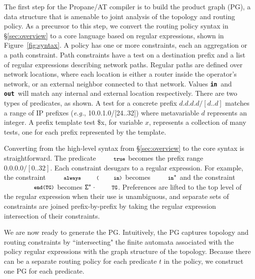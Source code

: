 \documentclass[numbers, 10pt, preprint]{sigplanconf}
\newcommand{\EG}{\emph{e.g.}}
\newcommand{\sysname}{{\text{}\small \sf Propane/AT}\xspace}
\newcommand{\CD}[1]{\texttt{\small #1}}
\newcommand{\KW}[1]{\texttt{\small\bfseries{#1}}}
\newcommand{\True}{\CD{true}}
\newcommand{\Prefer}{\texttt{>>}}
\newcommand{\Path}{\texttt{=>}}
\newcommand{\In}{\KW{in}}
\newcommand{\Out}{\KW{out}}
\newcommand{\Exit}{\KW{exit}}
\newcommand{\End}{\KW{end}}
\newcommand{\Always}{\KW{always}}
\begin{document}
The first step for the \sysname compiler is to build the product graph (PG), a data structure that is amenable to joint analysis of the topology and routing policy. As a precursor to this step, we convert the routing policy syntax in \S\ref{sec:overview} to a core language based on regular expressions, shown in Figure~\ref{fig:syntax}.
%
A policy has one or more constraints, each an aggregation or a path constraint. Path constraints have a test on a destination prefix and a list of regular expressions describing network paths. Regular paths are defined over network locations, where each location is either a router inside the operator's network, or an external neighbor connected to that network. Values \In\ and \Out\ will match any internal and external location respectively. There are two types of predicates, as shown. A test for a concrete prefix $d.d.d.d/[d..d]$ matches a range of IP prefixes (\EG, 10.0.1.0/[24..32]) where metavariable $d$ represents an integer. A prefix template test {\small\$x}, for variable $x$, represents a collection of many tests, one for each prefix represented by the template.

Converting from the high-level syntax from \S\ref{sec:overview} to the core syntax is straightforward. The predicate $\True$ becomes the prefix range $0.0.0.0/[0..32]$.
%
Each constraint desugars to a regular expression. For example, the constraint $\Always\CD{(\In)}$ becomes $\In^*$ and the constraint $\CD{\End(TG)}$ becomes $\mathtt{\Sigma}^* \cdot \CD{TG}$.
%
Preferences are lifted to the top level of the regular expression when their use is unambiguous, and separate sets of constraints are joined prefix-by-prefix by taking the regular expression intersection of their constraints.

%
%

We are now ready to generate the PG. Intuitively, the PG captures topology and routing constraints by ``intersecting" the finite automata associated with the policy regular expressions with the graph structure of the topology.
%
%
Because there can be a separate routing policy for each predicate $t$ in the policy, we construct one PG for each predicate.
\end{document}
